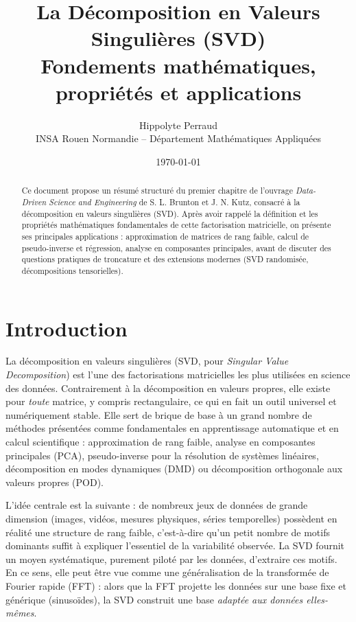 \documentclass[11pt,a4paper]{article}
\title{\vspace{-1.5cm}\textbf{La Décomposition en Valeurs Singulières (SVD)\\
\large Fondements mathématiques, propriétés et applications}}
\author{Hippolyte Perraud \\ \small INSA Rouen Normandie -- Département Mathématiques Appliquées}
\date{\today}
\begin{document}
\maketitle
\thispagestyle{fancy}

\begin{abstract}
\noindent Ce document propose un résumé structuré du premier chapitre de l'ouvrage \emph{Data-Driven Science and Engineering} de S. L. Brunton et J. N. Kutz, consacré à la décomposition en valeurs singulières (SVD). Après avoir rappelé la définition et les propriétés mathématiques fondamentales de cette factorisation matricielle, on présente ses principales applications : approximation de matrices de rang faible, calcul de pseudo-inverse et régression, analyse en composantes principales, avant de discuter des questions pratiques de troncature et des extensions modernes (SVD randomisée, décompositions tensorielles).
\end{abstract}

\vspace{0.3cm}

\section{Introduction}

La décomposition en valeurs singulières (SVD, pour \emph{Singular Value Decomposition}) est l'une des factorisations matricielles les plus utilisées en science des données. Contrairement à la décomposition en valeurs propres, elle existe pour \emph{toute} matrice, y compris rectangulaire, ce qui en fait un outil universel et numériquement stable. Elle sert de brique de base à un grand nombre de méthodes présentées comme fondamentales en apprentissage automatique et en calcul scientifique : approximation de rang faible, analyse en composantes principales (PCA), pseudo-inverse pour la résolution de systèmes linéaires, décomposition en modes dynamiques (DMD) ou décomposition orthogonale aux valeurs propres (POD).

L'idée centrale est la suivante : de nombreux jeux de données de grande dimension (images, vidéos, mesures physiques, séries temporelles) possèdent en réalité une structure de rang faible, c'est-à-dire qu'un petit nombre de motifs dominants suffit à expliquer l'essentiel de la variabilité observée. La SVD fournit un moyen systématique, purement piloté par les données, d'extraire ces motifs. En ce sens, elle peut être vue comme une généralisation de la transformée de Fourier rapide (FFT) : alors que la FFT projette les données sur une base fixe et générique (sinusoïdes), la SVD construit une base \emph{adaptée aux données elles-mêmes}.
\end{document}
